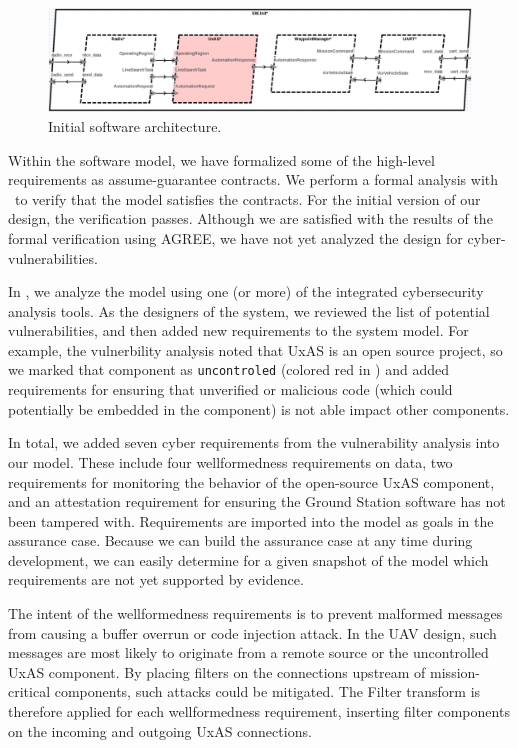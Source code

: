 \begin{figure}[h]
	\centering
	\includegraphics[width=2\columnwidth]{figs/sw-initial.png}
	\caption{Initial software architecture.}
	\label{fig:sw-initial}
\end{figure}

Within the software model, we have formalized some of the high-level requirements as assume-guarantee contracts.  We perform a formal analysis with \agr\ to verify that the model satisfies the contracts.  For the initial version of our design, the verification passes.
%
Although we are satisfied with the results of the formal verification using AGREE, we have not yet analyzed the design for cyber-vulnerabilities.

In \brfcs, we analyze the model using one (or more) of the integrated cybersecurity analysis tools.
As the designers of the system, we reviewed the list of potential vulnerabilities, and then added new requirements to the system model.
%
For example, the vulnerbility analysis noted that UxAS is an open source project, so we marked that component as \texttt{uncontroled} (colored red in ) and added requirements for ensuring that unverified or malicious code (which could potentially be embedded in the component) is not able impact other components.

In total, we added seven cyber requirements from the vulnerability analysis into our model.  These include four wellformedness requirements on data, two requirements for monitoring the behavior of the open-source UxAS component, and an attestation requirement for ensuring the Ground Station software has not been tampered with.  Requirements are imported into the model as goals in the assurance case.  Because we can build the assurance case at any time during development, we can easily determine for a given snapshot of the model which requirements are not yet supported by evidence.

The intent of the wellformedness requirements is to prevent
malformed messages from causing a buffer overrun or code injection
attack.  In the UAV design, such messages are most likely to originate
from a remote source or the uncontrolled UxAS component.  By placing
filters on the connections upstream of mission-critical components,
such attacks could be mitigated.  The Filter transform is therefore
applied for each wellformedness requirement, inserting filter
components on the incoming and outgoing UxAS connections.


